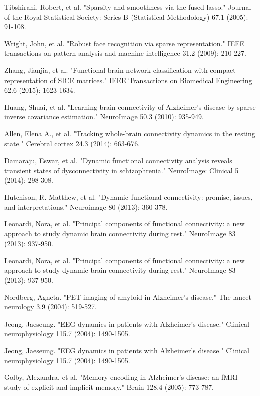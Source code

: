\documentclass[journal]{IEEEtran}
\begin{document}
\begin{thebibliography}{1}
		Tibshirani, Robert, et al. "Sparsity and smoothness via the fused lasso." Journal of the Royal Statistical Society: Series B (Statistical Methodology) 67.1 (2005): 91-108.
		
		Wright, John, et al. "Robust face recognition via sparse representation." IEEE transactions on pattern analysis and machine intelligence 31.2 (2009): 210-227.
		
		Zhang, Jianjia, et al. "Functional brain network classification with compact representation of SICE matrices." IEEE Transactions on Biomedical Engineering 62.6 (2015): 1623-1634.
		
		Huang, Shuai, et al. "Learning brain connectivity of Alzheimer's disease by sparse inverse covariance estimation." NeuroImage 50.3 (2010): 935-949.
		
		Allen, Elena A., et al. "Tracking whole-brain connectivity dynamics in the resting state." Cerebral cortex 24.3 (2014): 663-676.
		
		Damaraju, Eswar, et al. "Dynamic functional connectivity analysis reveals transient states of dysconnectivity in schizophrenia." NeuroImage: Clinical 5 (2014): 298-308.
		
		Hutchison, R. Matthew, et al. "Dynamic functional connectivity: promise, issues, and interpretations." Neuroimage 80 (2013): 360-378.
		
		Leonardi, Nora, et al. "Principal components of functional connectivity: a new approach to study dynamic brain connectivity during rest." NeuroImage 83 (2013): 937-950.
		
		Leonardi, Nora, et al. "Principal components of functional connectivity: a new approach to study dynamic brain connectivity during rest." NeuroImage 83 (2013): 937-950.
		
		Nordberg, Agneta. "PET imaging of amyloid in Alzheimer's disease." The lancet neurology 3.9 (2004): 519-527.
		
		Jeong, Jaeseung. "EEG dynamics in patients with Alzheimer's disease." Clinical neurophysiology 115.7 (2004): 1490-1505.
		
		Jeong, Jaeseung. "EEG dynamics in patients with Alzheimer's disease." Clinical neurophysiology 115.7 (2004): 1490-1505.
		
		Golby, Alexandra, et al. "Memory encoding in Alzheimer's disease: an fMRI study of explicit and implicit memory." Brain 128.4 (2005): 773-787.
		

\end{thebibliography}
\end{document}
